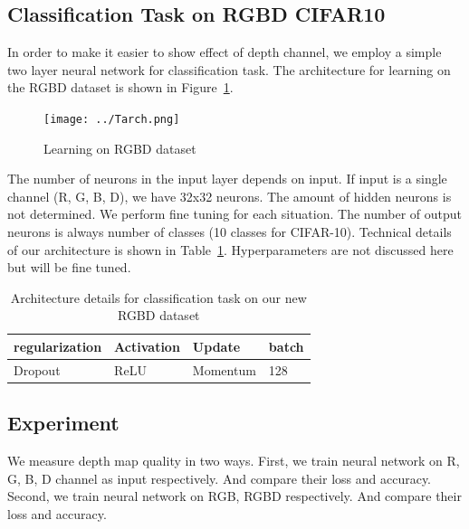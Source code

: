 \documentclass[journal]{IEEEtran}
\begin{document}
\subsection{Classification Task on RGBD CIFAR10}
In order to make it easier to show effect of depth channel,
we employ a simple two layer neural network for classification task.
The architecture for learning on the RGBD dataset is shown in Figure~\ref{fig:tarch}. 
\begin{figure}
	\texttt{[image: ../Tarch.png]}
	\caption{Learning on RGBD dataset}
	\label{fig:tarch}
\end{figure}
The number of neurons in the input layer depends on input.
If input is a single channel (R, G, B, D), we have 32x32 neurons.
The amount of hidden neurons is not determined. We perform fine tuning 
for each situation. The number of output neurons is always number of classes (10 classes
for CIFAR-10). Technical details of our architecture is shown in Table~\ref{tab:details}. 
Hyperparameters are not discussed here but will be fine tuned.
\begin{table}
	\begin{center}
		\begin{tabular}{|l|l|l|l|}
			\hline
			regularization&Activation&Update&batch\\
			\hline
			Dropout&ReLU&Momentum&128\\
			\hline
		\end{tabular}
	\end{center}
	\caption{Architecture details for classification task on our new RGBD dataset}
	\label{tab:details}
\end{table}


\subsection{Experiment}
We measure depth map quality in two ways. 
First, we train neural network on R, G, B, D channel as input respectively.
And compare their loss and accuracy. 
Second, we train neural network on RGB, RGBD respectively. 
And compare their loss and accuracy.
\end{document}
